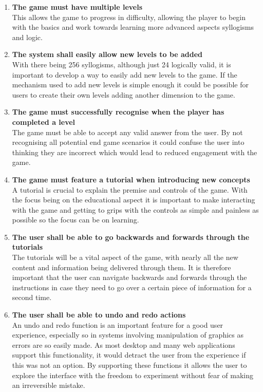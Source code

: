 \documentclass[12pt,a4paper]{report}
\begin{document}
\begin{enumerate}[label*=\arabic*]
            \item \textbf{The game must have multiple levels}\\
This allows the game to progress in difficulty, allowing the player to begin with the basics and work towards learning more advanced aspects syllogisms and logic.

	                         	  \item \textbf{The system shall easily allow new levels to be added}\\
With there being 256 syllogisms, although just 24 logically valid, it is important to develop a way to easily add new levels to the game. If the mechanism used to add new levels is simple enough it could be possible for users to create their own levels adding another dimension to the game.

 \item \textbf{The game must successfully recognise when the player has completed a level}\\
The game must be able to accept any valid answer from the user. By not recognising all potential end game scenarios it could confuse the user into thinking they are incorrect which would lead to reduced engagement with the game.

 \item \textbf{The game must feature a tutorial when introducing new concepts}\\
A tutorial is crucial to explain the premise and controls of the game. With the focus being on the educational aspect it is important to make interacting with the game and getting to grips with the controls as simple and painless as possible so the focus can be on learning.


	  \item \textbf{The user shall be able to go backwards and forwards through the tutorials}\\
The tutorials will be a vital aspect of the game, with nearly all the new content and information being delivered through them. It is therefore important that the user can navigate backwards and forwards through the instructions in case they need to go over a certain piece of information for a second time.
           
           
            	  \item \textbf{The user shall be able to undo and redo actions}\\
An undo and redo function is an important feature for a good user experience, especially so in systems involving manipulation of graphics as errors are so easily made. As most desktop and many web applications support this functionality, it would detract the user from the experience if this was not an option. By supporting these functions it allows the user to explore the interface with the freedom to experiment without fear of making an irreversible mistake. 
            

\end{enumerate}
\end{document}
